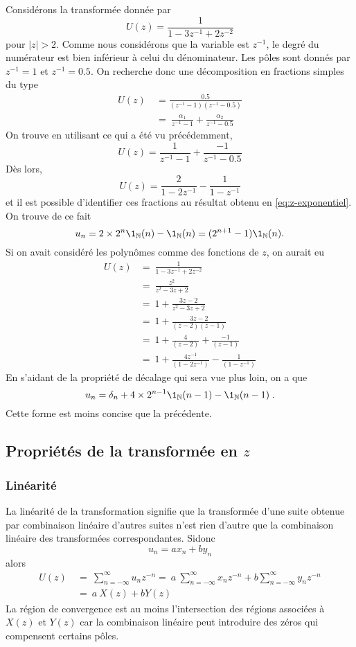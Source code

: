 \begin{example}
Consid\'{e}rons la transform\'{e}e donn\'{e}e par
$$
U(z)=\frac{1}{1-3z^{-1}+2z^{-2}}
$$
pour $|z|>2$. Comme nous consid\'{e}rons que la variable est $z^{-1}$, le degr\'{e} du num\'{e}rateur est bien inf\'{e}rieur \`{a} celui du d\'{e}nominateur.
Les p\^{o}les sont donn\'{e}s par $z^{-1}=1$ et $z^{-1}=0.5$. On recherche donc une d\'{e}composition en fractions simples du type
\begin{align*}
U(z)\ &= \frac{0.5}{(z^{-1}-1)(z^{-1}-0.5)} \\
      &=\ \frac{\alpha_{1}}{z^{-1}-1}+\frac{\alpha_{2}}{z^{-1}-0.5}
\end{align*}
On trouve en utilisant ce qui a \'{e}t\'{e} vu pr\'{e}c\'{e}demment,
$$
U(z)=\frac{1}{z^{-1}-1}+\frac{-1}{z^{-1}-0.5}
$$
D\`{e}s lors,
$$
U(z)=\frac{2}{1-2z^{-1}}-\frac{1}{1-z^{-1}}
$$
et il est possible d'identifier ces fractions au r\'{e}sultat obtenu en \eqref{eq:z-exponentiel}. On trouve de ce fait
$$
u_n=2\times 2^{n} \1_{\nset}(n) - \1_{\nset}(n)=(2^{n+1}-1) \1_{\nset}(n) .
$$
Si on avait consid\'{e}r\'{e} les polyn\^{o}mes comme des fonctions de $z$, on aurait eu
\begin{align*}
U(z) &=\ \frac{1}{1-3z^{-1}+2z^{-2}} \\
     &=\ \frac{z^{2}}{z^{2}-3z+2}\\
     &=\ 1+\frac{3z-2}{z^{2}-3z+2}\\
     &=\ 1+\frac{3z-2}{(z-2)(z-1)}\\
     &=\ 1+\frac{4}{(z-2)}+\frac{-1}{(z-1)}\\
     &=\ 1+\frac{4z^{-1}}{(1-2z^{-1})}-\frac{1}{(1-z^{-1})}
\end{align*}
En s'aidant de la propri\'{e}t\'{e} de d\'{e}calage qui sera vue plus loin, on a que
$$
u_n=\delta_n +4\times 2^{n-1} \1_{\nset}(n-1)-\1_{\nset}(n-1) \eqsp.
$$
Cette forme est moins concise que la pr\'{e}c\'{e}dente.
\end{example}
\subsection{Propri\'{e}t\'{e}s de la transform\'{e}e en $z$}
\subsubsection{Lin\'{e}arit\'{e}}
La lin\'{e}arit\'{e} de la transformation signifie que la transform\'{e}e d'une suite obtenue par combinaison lin\'{e}aire d'autres suites n'est rien d'autre que la combinaison lin\'{e}aire des transform\'{e}es correspondantes. Sidonc
$$
u_n=a x_n +b y_n
$$
alors
\begin{align*}
U(z)\ &=\ \sum_{n=-\infty}^{\infty} u_n z^{-n} =\ a\ \sum_{n=-\infty}^{\infty}x_{n} z^{-n}+b\sum_{n=-\infty}^{\infty} y_n z^{-n} \\
&=\ a\ X(z)+bY(z)
\end{align*}
La r\'{e}gion de convergence est au moins l'intersection des r\'{e}gions associ\'{e}es \`{a} $X(z)$ et $Y(z)$ car la combinaison lin\'{e}aire peut introduire des z\'{e}ros qui compensent certains p\^{o}les.


